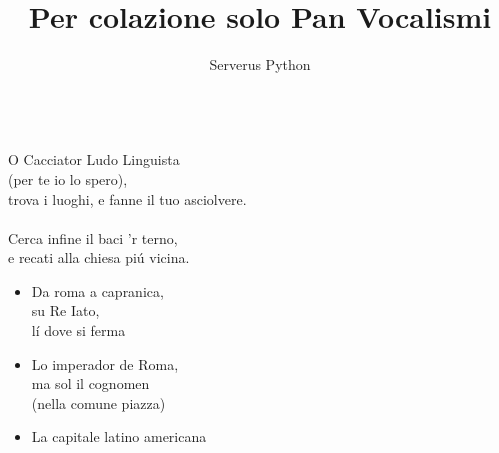 \documentclass[20pt,a4paper]{extarticle}
\title{Per colazione solo Pan Vocalismi}
\author{Serverus Python}
\begin{document}
\maketitle

\ \\
O Cacciator Ludo Linguista \\
(per te io lo spero),\\
trova i luoghi, e fanne il tuo asciolvere.\\
\ \\
Cerca infine il baci 'r terno,\\
e recati alla chiesa piú vicina.

\begin{itemize}
\item Da roma a capranica, \\su Re Iato, \\
  lí dove si ferma

\item Lo imperador de Roma, \\ma sol il cognomen\\
  (nella comune piazza)

\item La capitale latino americana

\end{itemize}
\end{document}
